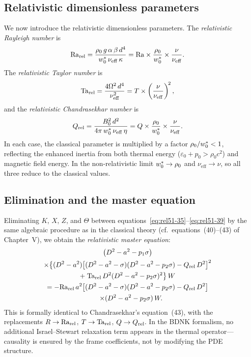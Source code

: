 \subsection{Relativistic dimensionless parameters}
\label{sec:rel-dimless}

We now introduce the relativistic dimensionless parameters.  The
\emph{relativistic Rayleigh number} is
\begin{equation}
  \mathrm{Ra}_{\mathrm{rel}}
  = \frac{\rho_{0}\,g\,\alpha\,\beta\,d^{4}}
         {w^{*}_{0}\,\nu_{\mathrm{eff}}\,\kappa}
  = \mathrm{Ra}\times
    \frac{\rho_{0}}{w^{*}_{0}}
    \times\frac{\nu}{\nu_{\mathrm{eff}}}.
  \label{eq:rel51-Rarel}
\end{equation}
The \emph{relativistic Taylor number} is
\begin{equation}
  \mathrm{Ta}_{\mathrm{rel}}
  = \frac{4\Omega^{2}\,d^{4}}{\nu_{\mathrm{eff}}^{2}}
  = T\times\left(\frac{\nu}{\nu_{\mathrm{eff}}}\right)^{\!2},
  \label{eq:rel51-Tarel}
\end{equation}
and the \emph{relativistic Chandrasekhar number} is
\begin{equation}
  Q_{\mathrm{rel}}
  = \frac{B_{0}^{2}\,d^{2}}
         {4\pi\,w^{*}_{0}\,\nu_{\mathrm{eff}}\,\eta}
  = Q\times
    \frac{\rho_{0}}{w^{*}_{0}}
    \times\frac{\nu}{\nu_{\mathrm{eff}}}.
  \label{eq:rel51-Qrel}
\end{equation}
In each case, the classical parameter is multiplied by a factor
$\rho_{0}/w^{*}_{0} < 1$, reflecting the enhanced inertia
from both thermal energy ($\varepsilon_0 + p_0 > \rho_0 c^2$) and
magnetic field energy.  In the non-relativistic limit
$w^{*}_{0} \to \rho_{0}$ and $\nu_{\mathrm{eff}}\to\nu$,
so all three reduce to the classical values.

\subsection{Elimination and the master equation}
\label{sec:master-eqn}

Eliminating $K$, $X$, $Z$, and $\Theta$ between
equations~\eqref{eq:rel51-35}--\eqref{eq:rel51-39} by the same
algebraic procedure as in the classical theory
(cf.\ equations~(40)--(43) of Chapter~V), we obtain the
\emph{relativistic master equation}:
\begin{multline}
  \bigl(D^{2}-a^{2}-p_{1}\sigma\bigr)\\
  \times\bigl\{(D^{2}-a^{2})
    \bigl[(D^{2}-a^{2}-\sigma)(D^{2}-a^{2}-p_{2}\sigma)
      -Q_{\mathrm{rel}}\,D^{2}\bigr]^{2}\\
  +\;\mathrm{Ta}_{\mathrm{rel}}\,D^{2}(D^{2}-a^{2}-p_{2}\sigma)^{2}\bigr\}\,W\\
  = -\mathrm{Ra}_{\mathrm{rel}}\,a^{2}
    \bigl[(D^{2}-a^{2}-\sigma)(D^{2}-a^{2}-p_{2}\sigma)
      -Q_{\mathrm{rel}}\,D^{2}\bigr]\\
  \quad\times(D^{2}-a^{2}-p_{2}\sigma)\,W.
  \label{eq:rel51-master}
\end{multline}
This is formally identical to Chandrasekhar's equation~(43), with the
replacements $R\to\mathrm{Ra}_{\mathrm{rel}}$, $T\to\mathrm{Ta}_{\mathrm{rel}}$, $Q\to Q_{\mathrm{rel}}$.  In the BDNK
formalism, no additional Israel--Stewart relaxation term appears in the
thermal operator---causality is ensured by the frame coefficients, not
by modifying the PDE structure.

